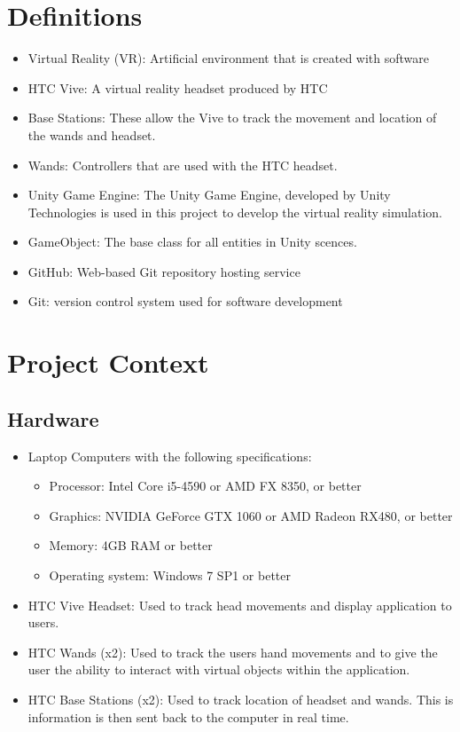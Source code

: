 \documentclass[10pt,journal,compsoc,onecolumn, draftclsnofoot]{IEEEtran}
\begin{document}
\section{Definitions}
\begin{itemize}
  \item Virtual Reality (VR):  Artificial environment that is created with software
  \item HTC Vive: A virtual reality headset produced by HTC
  \item Base Stations: These allow the Vive to track the movement and location of the wands and headset.
  \item Wands: Controllers that are used with the HTC headset.
  \item Unity Game Engine: The Unity Game Engine, developed by Unity Technologies is used in this project to develop the virtual reality simulation.
  \item GameObject: The base class for all entities in Unity scences.
  \item GitHub: Web-based Git repository hosting service
  \item Git: version control system used for software development
\end{itemize}


\section{Project Context}
\subsection{Hardware}
\begin{itemize}
  \item Laptop Computers with the following specifications:
  \begin{itemize}
    \item Processor: Intel Core i5-4590 or AMD FX 8350, or better
    \item Graphics: NVIDIA GeForce GTX 1060 or AMD Radeon RX480, or better
    \item Memory: 4GB RAM or better
    \item Operating system: Windows 7 SP1 or better
  \end{itemize}
  \item HTC Vive Headset: Used to track head movements and display application to users.
  \item HTC Wands (x2): Used to track the users hand movements and to give the user the ability to interact with virtual objects within the application.
  \item HTC Base Stations (x2): Used to track location of headset and wands. This is information is then sent back to the computer in real time.
\end{itemize}
\end{document}
